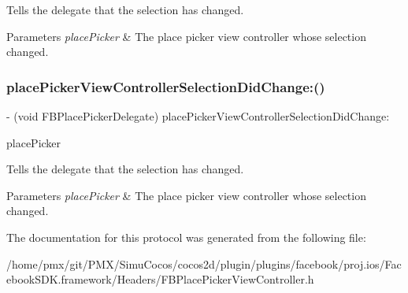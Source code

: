 Tells the delegate that the selection has changed.


\begin{DoxyParams}{Parameters}
{\em place\+Picker} & The place picker view controller whose selection changed. \\
\hline
\end{DoxyParams}
\mbox{\label{protocolFBPlacePickerDelegate_01-p_a45f5c05ae6b3d030c4350562954964db}} 
\subsubsection{\texorpdfstring{place\+Picker\+View\+Controller\+Selection\+Did\+Change\+:()}{placePickerViewControllerSelectionDidChange:()}\hspace{0.1cm}{\footnotesize\ttfamily [5/5]}}
{\footnotesize\ttfamily -\/ (void F\+B\+Place\+Picker\+Delegate) place\+Picker\+View\+Controller\+Selection\+Did\+Change\+: \begin{DoxyParamCaption}\item[{(\hyperlink{interfaceFBPlacePickerViewController}{F\+B\+Place\+Picker\+View\+Controller} $\ast$)}]{place\+Picker }\end{DoxyParamCaption}\hspace{0.3cm}{\ttfamily [optional]}}

Tells the delegate that the selection has changed.


\begin{DoxyParams}{Parameters}
{\em place\+Picker} & The place picker view controller whose selection changed. \\
\hline
\end{DoxyParams}


The documentation for this protocol was generated from the following file\+:\begin{DoxyCompactItemize}
\item 
/home/pmx/git/\+P\+M\+X/\+Simu\+Cocos/cocos2d/plugin/plugins/facebook/proj.\+ios/\+Facebook\+S\+D\+K.\+framework/\+Headers/F\+B\+Place\+Picker\+View\+Controller.\+h\end{DoxyCompactItemize}
